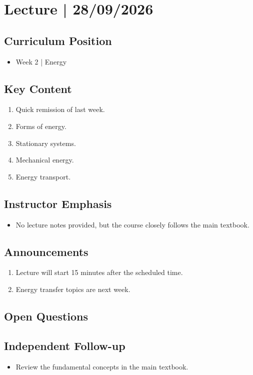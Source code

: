 \section{Lecture | 28/09/2026}


\subsection*{Curriculum Position}
\begin{itemize}
	\item Week 2 | Energy 
\end{itemize}

\subsection*{Key Content}
\begin{enumerate}
	\item Quick remission of last week. 
	\item Forms of energy.
	\item Stationary systems.
	\item Mechanical energy.
	\item Energy transport. 
	
\end{enumerate}

\subsection*{Instructor Emphasis}
\begin{itemize}
	\item No lecture notes provided, but the course closely follows the main textbook. 
	
\end{itemize} 

\subsection*{Announcements}
\begin{enumerate}
	\item Lecture will start 15 minutes after the scheduled time.
	\item Energy transfer topics are next week.
\end{enumerate}


\subsection*{Open Questions}


\subsection*{Independent Follow-up}
\begin{itemize}
	\item Review the fundamental concepts in the main textbook.
\end{itemize}


